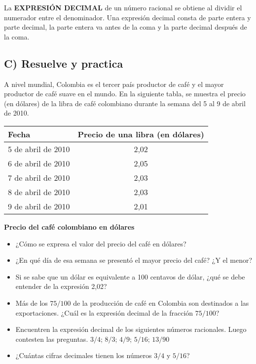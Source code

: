 \documentclass[12pt,a4paper]{article}
\begin{document}
La \textbf{EXPRESIÓN DECIMAL} de un número racional se obtiene al dividir el numerador entre el denominador. Una expresión decimal consta de parte entera y parte decimal, la parte entera va antes de la coma y la parte decimal después de la coma.


\subsection*{C) Resuelve y practica}

A nivel mundial, Colombia es el tercer país productor de café y el mayor productor de café suave en el mundo. En la siguiente tabla, se muestra el precio (en dólares) de la libra de café colombiano durante la semana del 5 al 9 de abril de 2010.

\vspace{0.5cm}

\begin{center}
\begin{tabular}{|l|c|}
\hline
\textbf{Fecha} & \textbf{Precio de una libra (en dólares)} \\
\hline
5 de abril de 2010 & 2,02 \\
\hline
6 de abril de 2010 & 2,05 \\
\hline
7 de abril de 2010 & 2,03 \\
\hline
8 de abril de 2010 & 2,03 \\
\hline
9 de abril de 2010 & 2,01 \\
\hline
\end{tabular}
\end{center}

\vspace{0.5cm}

\textbf{Precio del café colombiano en dólares}

\begin{itemize}
\item ¿Cómo se expresa el valor del precio del café en dólares?
\item ¿En qué día de esa semana se presentó el mayor precio del café? ¿Y el menor?
\item Si se sabe que un dólar es equivalente a 100 centavos de dólar, ¿qué se debe entender de la expresión 2,02?
\item Más de los $75/ 100$ de la producción de café en Colombia son destinados a las exportaciones. ¿Cuál es la expresión decimal de la fracción $75/ 100$?
\item Encuentren la expresión decimal de los siguientes números racionales. Luego contesten las preguntas. $3/4$; $8/3$; $4/9$; $5/ 16$; $13/ 90$
\item ¿Cuántas cifras decimales tienen los números $3/ 4$ y $5 /16$?
\end{itemize}
\end{document}
